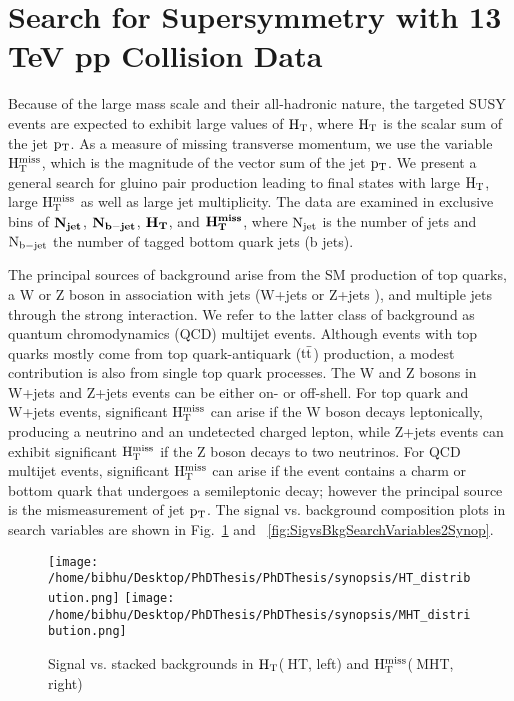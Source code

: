 \section{ Search for Supersymmetry with 13 TeV pp Collision Data}




Because of the large mass scale and their all-hadronic nature, the targeted SUSY events are expected to exhibit large values of $\rm H_{T}$,
where $\rm H_{T}$ is the scalar sum of the jet $\rm p_{T}$. As a measure of missing
transverse momentum, we use the variable $\rm H_{T}^{miss}$, which is the magnitude of the vector sum of
the jet $\rm p_{T}$. We present a general search for gluino pair production leading to final states with
large $\rm H_{T}$, large $\rm H_{T}^{miss}$ as well as large jet multiplicity. The data are examined in exclusive bins of $ \rm \bf{ N_{jet}}$, $ \rm \bf{ N_{b-jet}}$, $ \rm \bf{ H_{T}}$,
and $ \rm \bf{H_{T}^{miss}}$, where $\rm N_{jet}$ is the number of jets and $\rm N_{b-jet}$ the number of tagged bottom quark jets
(b jets). 


The principal sources of background arise from the SM production of top quarks, a W or Z
boson in association with jets (W+jets or Z+jets ), and multiple jets through the strong
interaction. We refer to the latter class of background as quantum chromodynamics (QCD)
multijet events. Although events with top quarks mostly come from top quark-antiquark ($\rm t\bar{t}$) production,
a modest contribution is also from single top quark processes. The W and Z bosons in W+jets and Z+jets events
can be either on- or off-shell. For top quark and W+jets events, significant $\rm H_{T}^{miss}$  can arise if the
W boson decays leptonically, producing a neutrino and an undetected charged lepton, while
Z+jets events can exhibit significant $\rm H_{T}^{miss}$ if the Z boson decays to two neutrinos. For QCD
multijet events, significant $\rm H_{T}^{miss}$ can arise if the event contains a charm or bottom quark that
undergoes a semileptonic decay; however the principal source is the mismeasurement of
jet $\rm p_{T}$. The signal vs. background composition plots in search variables are shown in Fig.~\ref{fig:SigvsBkgSearchVariables1Synop} and ~\ref{fig:SigvsBkgSearchVariables2Synop}.

\begin{figure}[h]
\begin{center}
\texttt{[image: /home/bibhu/Desktop/PhDThesis/PhDThesis/synopsis/HT\_distribution.png]}
\texttt{[image: /home/bibhu/Desktop/PhDThesis/PhDThesis/synopsis/MHT\_distribution.png]}
\caption{\label{fig:SigvsBkgSearchVariables1Synop} Signal vs. stacked backgrounds in $\rm H_{T}$($~$HT, left) and $\rm H_{T}^{miss}$($~$MHT, right)}
\end{center}
\end{figure}

